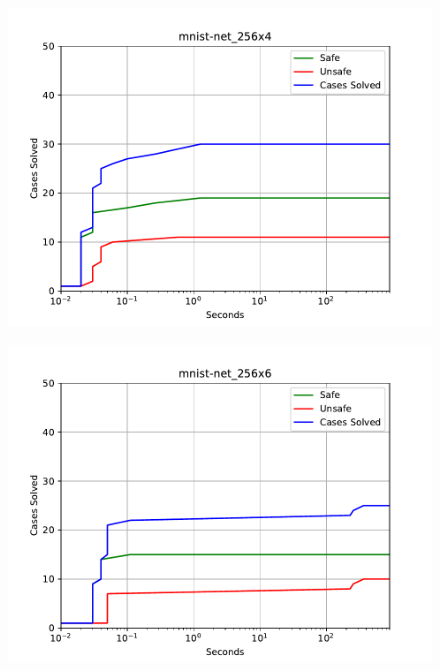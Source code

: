 \begin{figure}[!ht]
\center
\includegraphics[scale=0.8]{figures/mnist-net_256x4.pdf}
\end{figure}

\begin{figure}[!ht]
\center
\includegraphics[scale=0.8]{figures/mnist-net_256x6.pdf}
\end{figure}

